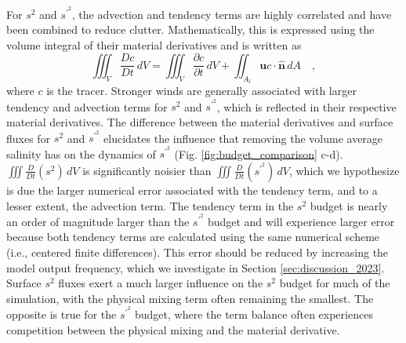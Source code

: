 For $s^2$ and $s^{\prime^2}$, the advection and tendency terms are highly correlated and have been combined to reduce clutter. Mathematically, this is expressed using the volume integral of their material derivatives and is written as 
\begin{equation}
    \iiint_V \frac{Dc}{Dt} \, dV = \iiint_V \frac{\partial c}{\partial t} \, dV + \iint_{A_l} \mathbf{u}c \cdot \hat{\mathbf{n}} \, dA \quad ,
\end{equation}
 where $c$ is the tracer. Stronger winds are generally associated with larger tendency and advection terms for $s^2$ and $s^{\prime^2}$, which is reflected in their respective material derivatives. The difference between the material derivatives and surface fluxes for $s^2$ and $s^{\prime^2}$ elucidates the influence that removing the volume average salinity has on the dynamics of $s^{\prime^2}$ (Fig. \ref{fig:budget_comparison} c-d). $\iiint \frac{D}{Dt}(s^2) \, dV$ is significantly noisier than $\iiint \frac{D}{Dt}(s^{\prime^2}) \, dV$, which we hypothesize is due the larger numerical error associated with the tendency term, and to a lesser extent, the advection term. The tendency term in the $s^2$ budget is nearly an order of magnitude larger than the $s^{\prime^2}$ budget and will experience larger error because both tendency terms are calculated using the same numerical scheme (i.e., centered finite differences). This error should be reduced by increasing the model output frequency, which we investigate in Section \ref{sec:discussion_2023}. Surface $s^2$ fluxes exert a much larger influence on the $s^2$ budget for much of the simulation, with the physical mixing term often remaining the smallest. The opposite is true for the $s^{\prime^2}$ budget, where the term balance often experiences competition between the physical mixing and the material derivative.  

